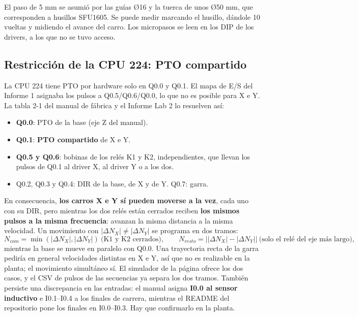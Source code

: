 \documentclass[a4paper,12pt]{article}
\begin{document}
El paso de 5 mm se asumió por las guías Ø16 y la tuerca de unos Ø50 mm, que corresponden a husillos
SFU1605. Se puede medir marcando el husillo, dándole 10 vueltas y midiendo el avance del carro. Los
micropasos se leen en los DIP de los drivers, a los que no se tuvo acceso.

\subsection{Restricción de la CPU 224: PTO compartido}
La CPU 224 tiene PTO por hardware solo en Q0.0 y Q0.1. El mapa de E/S del Informe 1 asignaba los pulsos a
Q0.5/Q0.6/Q0.0, lo que no es posible para X e Y. La tabla 2-1 del manual de fábrica \cite{manual} y el
Informe Lab 2 lo resuelven así:
\begin{itemize}
\item \textbf{Q0.0}: PTO de la base (eje Z del manual).
\item \textbf{Q0.1}: \textbf{PTO compartido} de X e Y.
\item \textbf{Q0.5 y Q0.6}: bobinas de los relés K1 y K2, independientes, que llevan los pulsos de Q0.1 al driver X, al driver Y o a los dos.
\item Q0.2, Q0.3 y Q0.4: DIR de la base, de X y de Y. Q0.7: garra.
\end{itemize}
En consecuencia, \textbf{los carros X e Y sí pueden moverse a la vez}, cada uno con su DIR, pero mientras
los dos relés están cerrados reciben \textbf{los mismos pulsos a la misma frecuencia}: avanzan la misma
distancia a la misma velocidad. Un movimiento con $|\Delta N_X| \neq |\Delta N_Y|$ se programa en dos tramos:
\begin{equation}
N_{com} = \min(|\Delta N_X|, |\Delta N_Y|)\ \text{(K1 y K2 cerrados)},\qquad
N_{resto} = \big||\Delta N_X| - |\Delta N_Y|\big|\ \text{(solo el relé del eje más largo)},
\end{equation}
mientras la base se mueve en paralelo con Q0.0. Una trayectoria recta de la garra pediría en general
velocidades distintas en X e Y, así que no es realizable en la planta; el movimiento simultáneo sí. El
simulador de la página ofrece los dos casos, y el CSV de pulsos de las secuencias ya separa los dos tramos. También persiste una discrepancia en las entradas: el manual asigna \textbf{I0.0 al sensor
inductivo} e I0.1--I0.4 a los finales de carrera, mientras el README del repositorio pone los finales en
I0.0--I0.3. Hay que confirmarlo en la planta.

\end{document}
